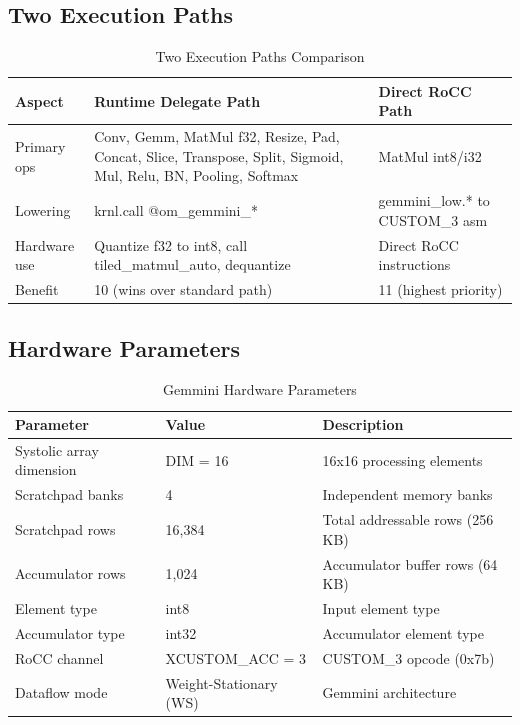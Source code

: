 \documentclass[12pt,a4paper]{article}
\begin{document}
\subsection{Two Execution Paths}

\begin{table}[H]
\centering
\begin{tabular}{|p{}|p{}|p{}|}
\hline
\textbf{Aspect} & \textbf{Runtime Delegate Path} & \textbf{Direct RoCC Path} \\
\hline
Primary ops & Conv, Gemm, MatMul f32, Resize, Pad, Concat, Slice, Transpose, Split, Sigmoid, Mul, Relu, BN, Pooling, Softmax & MatMul int8/i32 \\
\hline
Lowering & krnl.call @om\_gemmini\_* & gemmini\_low.* to CUSTOM\_3 asm \\
\hline
Hardware use & Quantize f32 to int8, call tiled\_matmul\_auto, dequantize & Direct RoCC instructions \\
\hline
Benefit & 10 (wins over standard path) & 11 (highest priority) \\
\hline
\end{tabular}
\caption{Two Execution Paths Comparison}
\end{table}

\subsection{Hardware Parameters}

\begin{table}[H]
\centering
\begin{tabular}{|p{}|p{}|p{}|}
\hline
\textbf{Parameter} & \textbf{Value} & \textbf{Description} \\
\hline
Systolic array dimension & DIM = 16 & 16x16 processing elements \\
\hline
Scratchpad banks & 4 & Independent memory banks \\
\hline
Scratchpad rows & 16,384 & Total addressable rows (256 KB) \\
\hline
Accumulator rows & 1,024 & Accumulator buffer rows (64 KB) \\
\hline
Element type & int8 & Input element type \\
\hline
Accumulator type & int32 & Accumulator element type \\
\hline
RoCC channel & XCUSTOM\_ACC = 3 & CUSTOM\_3 opcode (0x7b) \\
\hline
Dataflow mode & Weight-Stationary (WS) & Gemmini architecture \\
\hline
\end{tabular}
\caption{Gemmini Hardware Parameters}
\end{table}
\end{document}
